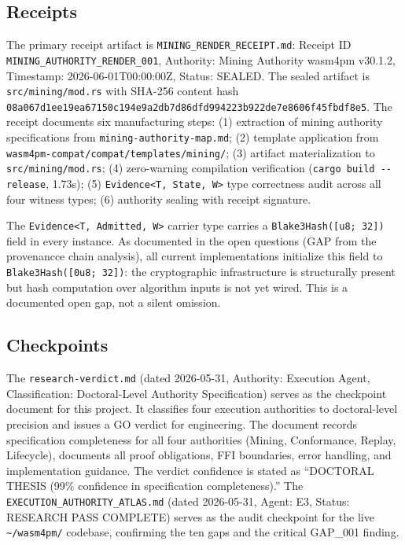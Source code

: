 \subsection{Receipts}
\label{sec:sources-wasm4pm-evidence-receipts}

The primary receipt artifact is \texttt{MINING\_RENDER\_RECEIPT.md}: Receipt ID
\texttt{MINING\_AUTHORITY\_RENDER\_001}, Authority: Mining Authority wasm4pm v30.1.2, Timestamp:
2026-06-01T00:00:00Z, Status: SEALED. The sealed artifact is \texttt{src/mining/mod.rs} with
SHA-256 content hash
\texttt{08a067d1ee19ea67150c194e9a2db7d86dfd994223b922de7e8606f45fbdf8e5}. The receipt documents
six manufacturing steps: (1) extraction of mining authority specifications from
\texttt{mining-authority-map.md}; (2) template application from
\texttt{wasm4pm-compat/compat/templates/mining/}; (3) artifact materialization to
\texttt{src/mining/mod.rs}; (4) zero-warning compilation verification (\texttt{cargo build
-{}-release}, 1.73s); (5) \texttt{Evidence<T,~State,~W>} type correctness audit across all four
witness types; (6) authority sealing with receipt signature.

The \texttt{Evidence<T,~Admitted,~W>} carrier type carries a \texttt{Blake3Hash([u8;~32])} field
in every instance. As documented in the open questions (GAP from the provenancce chain analysis),
all current implementations initialize this field to \texttt{Blake3Hash([0u8;~32])}: the
cryptographic infrastructure is structurally present but hash computation over algorithm inputs is
not yet wired. This is a documented open gap, not a silent omission.

\subsection{Checkpoints}
\label{sec:sources-wasm4pm-evidence-checkpoints}

The \texttt{research-verdict.md} (dated 2026-05-31, Authority: Execution Agent, Classification:
Doctoral-Level Authority Specification) serves as the checkpoint document for this project. It
classifies four execution authorities to doctoral-level precision and issues a GO verdict for
engineering. The document records specification completeness for all four authorities (Mining,
Conformance, Replay, Lifecycle), documents all proof obligations, FFI boundaries, error handling,
and implementation guidance. The verdict confidence is stated as ``DOCTORAL THESIS (99\%
confidence in specification completeness).'' The \texttt{EXECUTION\_AUTHORITY\_ATLAS.md}
(dated 2026-05-31, Agent: E3, Status: RESEARCH PASS COMPLETE) serves as the audit checkpoint for
the live \texttt{\textasciitilde/wasm4pm/} codebase, confirming the ten gaps and the critical
GAP\_001 finding.

